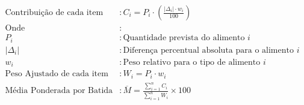 \begin{align*}
\text{Contribuição de cada item} & : C_i = P_i \cdot \left( \frac{|\Delta_i| \cdot w_i}{100} \right) \\
\text{Onde} & : \\
P_i & : \text{Quantidade prevista do alimento } i \\
|\Delta_i| & : \text{Diferença percentual absoluta para o alimento } i \\
w_i & : \text{Peso relativo para o tipo de alimento } i \\

\text{Peso Ajustado de cada item} & : W_i = P_i \cdot w_i \\

\text{Média Ponderada por Batida} & : \overline{M} = \frac{\sum_{i=1}^{n} C_i}{\sum_{i=1}^{n} W_i} \times 100
\end{align*}